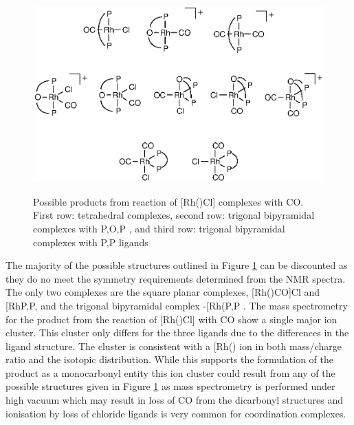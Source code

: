 \begin{figure}[htb]
\begin{center}
\vspace{0.5cm}
\includegraphics{../Figures/RhCOpossibilities.eps}
\caption[Possible products from reaction of \texorpdfstring{[Rh(\tBuxantphosk)Cl{]} complexes with CO} R]{Possible products from reaction of \texorpdfstring{[Rh(\tBuxantphosk)Cl] complexes with CO} R.  First row: tetrahedral complexes, second row: trigonal bipyramidal complexes with \dento{}P,O,P\textprime{} \tBuxantphos{}, and third row: trigonal bipyramidal complexes with \dento{}P,P\textprime{} \tBuxantphos{} ligands}
\vspace{0.2cm}
\label{RhCOpossibilities}
\end{center}
\end{figure}
\vspace{0.2cm}

The majority of the possible structures outlined in Figure \ref{RhCOpossibilities} can be discounted as they do no meet the symmetry requirements determined from the NMR spectra.  The only two complexes are the square planar complexes, [Rh(\tBuxantphosk)CO]Cl and [Rh\tBuxantphos\dento{}P,P\textprime\ce{(CO)2]Cl}, and the trigonal bipyramidal complex \trans-[Rh(\tBuxantphos\dento{}P,P\textprime\ce{(CO)2Cl]} .  The mass spectrometry for the product from the reaction of [Rh(\tBuxantphos)Cl] with CO show a single major ion cluster.  This cluster only differs for the three ligands due to the differences in the ligand structure.  The cluster is consistent with a [Rh(\tBuxantphos)\ce{(CO)]+} ion in both mass/charge ratio and the isotopic distribution.  While this supports the formulation of the product as a monocarbonyl entity this ion cluster could result from any of the possible structures given in Figure \ref{RhCOpossibilities} as mass spectrometry is performed under high vacuum which may result in loss of CO from the dicarbonyl structures and ionisation by loss of chloride ligands is very common for coordination complexes.

